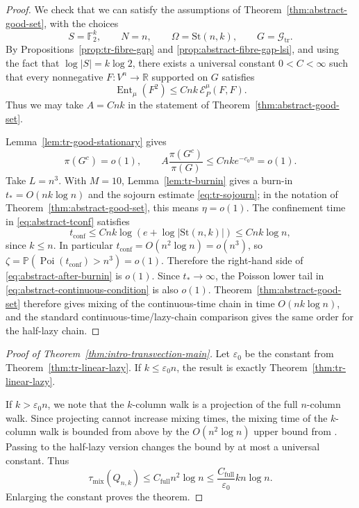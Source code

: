 \documentclass[11pt, reqno]{amsart}
\numberwithin{equation}{section}
\newcommand{\Ft}{\mathbb F_2}
\newcommand{\Stief}[2]{\mathrm{St}(#1,#2)}
\newcommand{\Ent}{\operatorname{Ent}}
\newcommand{\Prob}{\mathbb P}
\newcommand{\cE}{\mathcal E}
\newcommand{\Good}{\mathcal G}
\begin{document}
\begin{proof}
We check that we can satisfy the assumptions of Theorem~\ref{thm:abstract-good-set}, with the choices
\[
    S=\Ft^k,
    \qquad N=n,
    \qquad \Omega=\Stief{n}{k},
    \qquad G=\Good_{\mathrm{tr}}.
\]
By Propositions~\ref{prop:tr-fibre-gap} and \ref{prop:abstract-fibre-gap-lsi}, and using the fact that \(\log|S|=k\log2\), there exists a universal constant $0 < C< \infty$ such that every nonnegative
\(F:V^n\to\mathbb R\) supported on \(G\) satisfies
\begin{equation} \label{IneqLocalLogSob}
    \Ent_\mu(F^2)\le C nk\,\cE_P^\mu(F,F).
\end{equation}
Thus we may take \(A=Cnk\) in the statement of Theorem~\ref{thm:abstract-good-set}.

Lemma~\ref{lem:tr-good-stationary} gives
\[
    \pi(G^c)=o(1),
    \qquad
    A\frac{\pi(G^c)}{\pi(G)}
    \le Cnk e^{-c_0n}=o(1).
\]
Take \(L=n^3\).  With \(M=10\), Lemma~\ref{lem:tr-burnin} gives a burn-in
\(t_*=O(nk\log n)\) and the sojourn estimate \eqref{eq:tr-sojourn}; in the
notation of Theorem~\ref{thm:abstract-good-set}, this means \(\eta=o(1)\).
The confinement time in \eqref{eq:abstract-tconf} satisfies
\[
    t_{\mathrm{conf}}
    \le Cnk\log(e+\log|\Stief{n}{k}|)
    \le Cnk\log n,
\]
since \(k\le n\).  In particular \(t_{\mathrm{conf}}=O(n^2\log n)=o(n^3)\), so
\(\zeta=\Prob(\operatorname{Poi}(t_{\mathrm{conf}})>n^3)=o(1)\).  Therefore the
right-hand side of \eqref{eq:abstract-after-burnin} is \(o(1)\).  Since
\(t_*\to\infty\), the Poisson lower tail in
\eqref{eq:abstract-continuous-condition} is also \(o(1)\).  Theorem~\ref{thm:abstract-good-set}
therefore gives mixing of the continuous-time chain in time \(O(nk\log n)\), and the
standard continuous-time/lazy-chain comparison gives the same order for the half-lazy chain.
\end{proof}

\begin{proof}[Proof of Theorem~\ref{thm:intro-transvection-main}]
Let \(\varepsilon_0\) be the constant from Theorem~\ref{thm:tr-linear-lazy}.  If
\(k\le\varepsilon_0 n\), the result is exactly Theorem~\ref{thm:tr-linear-lazy}.


If \(k>\varepsilon_0 n\), we note that the $k$-column walk is a projection of the full $n$-column walk. Since projecting cannot increase mixing times, the mixing time of the $k$-column walk is bounded from above by the \(O(n^2\log n)\) upper bound from \cite[Theorem~1]{BenHamou2025}.  Passing to the half-lazy version changes the bound by at most a universal constant. Thus
\[
    \tau_{\mathrm{mix}}(Q_{n,k})\le C_{\mathrm{full}}n^2\log n
    \le \frac{C_{\mathrm{full}}}{\varepsilon_0}kn\log n.
\]
Enlarging the constant proves the theorem.
\end{proof}
\end{document}
